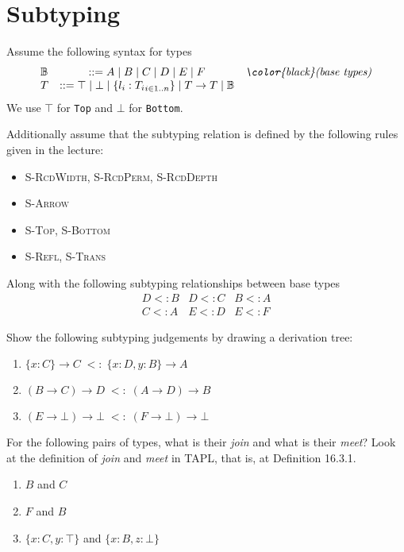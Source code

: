 \section{Subtyping}
Assume the following syntax for types
\[
  \begin{array}{lcr}
    \mathbb{B} &::= A \;|\; B \;|\; C \;|\; D \;|\; E \;|\; F &\textit{{\color{black}(base types)}}\\
    T &::= \top{} \;|\; \bot{} \;|\; \{{l_i: T_i}_{i\in 1..{n}}\} \;|\; T \to T \;|\; \mathbb{B}
  \end{array}
\]
We use $\top$ for \texttt{Top} and $\bot$ for \texttt{Bottom}.

Additionally assume that the subtyping relation is defined by the following rules given in the lecture:\\
\begin{itemize}
  \item \textsc{S-RcdWidth}, \textsc{S-RcdPerm}, \textsc{S-RcdDepth}
  \item \textsc{S-Arrow}
  \item \textsc{S-Top}, \textsc{S-Bottom}
  \item \textsc{S-Refl}, \textsc{S-Trans}
\end{itemize}
Along with the following subtyping relationships between base types 
\[
  \begin{array}{lcr}
    D<:B & D<:C & B<:A\\
    C<:A & E<:D & E<:F
  \end{array}
\]

Show the following subtyping judgements by drawing a derivation tree:
\begin{enumerate}
  \item $\{x : C\} \to C \;<:\; \{x: D, y: B\} \to A$
  \item $ (B\to C) \to D  \;<:\;  (A \to D) \to B$
  \item $ (E \to \bot) \to \bot \;<:\; (F \to \bot) \to \bot$
\end{enumerate}

For the following pairs of types, what is their \emph{join} and what is their \emph{meet}?
Look at the definition of \emph{join} and \emph{meet} in TAPL, that is, at Definition 16.3.1.
\begin{enumerate}
  \item $B$ and $C$
  \item $F$ and $B$
  \item $\{x: C, y: \top\}$ and $\{x: B, z: \bot\}$
\end{enumerate}


